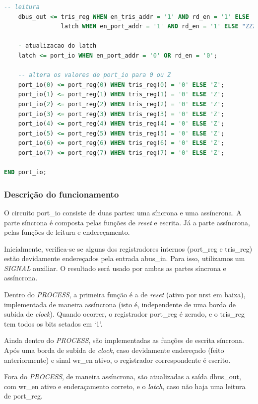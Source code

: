 \documentclass{article}
\begin{document}
\begin{lstlisting}[language=VHDL, caption={Código VHDL w\_reg}]
    -- leitura
    dbus_out <= tris_reg WHEN en_tris_addr = '1' AND rd_en = '1' ELSE 
                latch WHEN en_port_addr = '1' AND rd_en = '1' ELSE "ZZZZZZZZ";

    - atualizacao do latch
    latch <= port_io WHEN en_port_addr = '0' OR rd_en = '0';

    -- altera os valores de port_io para 0 ou Z
    port_io(0) <= port_reg(0) WHEN tris_reg(0) = '0' ELSE 'Z';
    port_io(1) <= port_reg(1) WHEN tris_reg(1) = '0' ELSE 'Z';
    port_io(2) <= port_reg(2) WHEN tris_reg(2) = '0' ELSE 'Z';
    port_io(3) <= port_reg(3) WHEN tris_reg(3) = '0' ELSE 'Z';
    port_io(4) <= port_reg(4) WHEN tris_reg(4) = '0' ELSE 'Z';
    port_io(5) <= port_reg(5) WHEN tris_reg(5) = '0' ELSE 'Z';
    port_io(6) <= port_reg(6) WHEN tris_reg(6) = '0' ELSE 'Z';
    port_io(7) <= port_reg(7) WHEN tris_reg(7) = '0' ELSE 'Z';

END port_io;
\end{lstlisting}

\subsubsection{Descrição do funcionamento}

O circuito port\_io consiste de duas partes: uma síncrona e uma assíncrona. A parte síncrona é composta pelas funções de \textit{reset} e escrita. Já a parte assíncrona, pelas funções de leitura e endereçamento.

Inicialmente, verifica-se se alguns dos registradores internos (port\_reg e tris\_reg) estão devidamente endereçados pela entrada abus\_in. Para isso, utilizamos um \textit{SIGNAL} auxiliar. O resultado será usado por ambas as partes síncrona e assíncrona.

Dentro do \textit{PROCESS}, a primeira função é a de \textit{reset} (ativo por nrst em baixa), implementada de maneira assíncrona (isto é, independente de uma borda de subida de \textit{clock}). Quando ocorrer, o registrador port\_reg é zerado, e o tris\_reg tem todos os bits setados em `1'.

Ainda dentro do \textit{PROCESS}, são implementadas as funções de escrita síncrona. Após uma borda de subida de \textit{clock}, caso devidamente endereçado (feito anteriormente) e sinal wr\_en ativo, o registrador correspondente é escrito.

Fora do \textit{PROCESS}, de maneira assíncrona, são atualizadas a saída dbus\_out, com wr\_en ativo e enderaçamento correto, e o \textit{latch}, caso não haja uma leitura de port\_reg.
\end{document}
